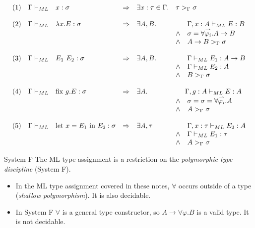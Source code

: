 \[\begin{matrix*}[l]
    (1) & \Gamma \vdash_{ML} & x : \sigma & \Rightarrow & \exists x:\tau \in \Gamma . & \tau >_\Gamma \sigma \\
    \\
    (2) & \Gamma \vdash_{ML} & \lambda x . E : \sigma & \Rightarrow & \exists A,B . & \ \ \quad  \Gamma, x:A \vdash_{ML} E : B  \\
    & & & & & \land \quad \sigma = \forall \overset{\rightharpoonup}{\varphi_i} . A \to B \\
    & & & & & \land \quad A \to B >_\Gamma \sigma \\
    \\ 
    (3) & \Gamma \vdash_{ML} & E_1 \ E_2 : \sigma & \Rightarrow & \exists A,B . & \ \ \quad \Gamma \vdash_{ML} E_1 : A \to B \\
    & & & & & \land \quad  \Gamma \vdash_{ML} E_2 : A \\
    & & & & & \land \quad  B >_{\Gamma} \sigma \\
    \\
    (4) & \Gamma \vdash_{ML} & \mlfix{g}{E} : \sigma & \Rightarrow & \exists A . & \ \quad \Gamma , g: A \vdash_{ML} E : A \\
    & & & & & \land \quad \sigma = \sigma = \forall \overset{\rightharpoonup}{\varphi_i} . A \\
    & & & & & \land \quad A >_\Gamma \sigma \\
    \\
    (5) & \Gamma \vdash_{ML} & \mllet{x = E_1}{E_2} : \sigma & \Rightarrow & \exists A, \tau & \ \ \quad \Gamma  , x: \tau \vdash_{ML} E_2 : A \\
    & & & & & \land \quad \Gamma \vdash_{ML} E_1 : \tau \\
    & & & & & \land \quad A >_\Gamma \sigma \\
\end{matrix*}\]

\begin{sidenotebox}{System F}
    The ML type assignment is a restriction on the \textit{polymorphic type discipline} (System F).
    \begin{itemize}
        \item In the ML type assignment covered in these notes, $\forall$ occurs outside of a type (\textit{shallow polymorphism}). It is also decidable.
        \item In System F $\forall$ is a general type constructor, so $A \to \forall \varphi . B$ is a valid type. It is not decidable.
    \end{itemize}
\end{sidenotebox}

